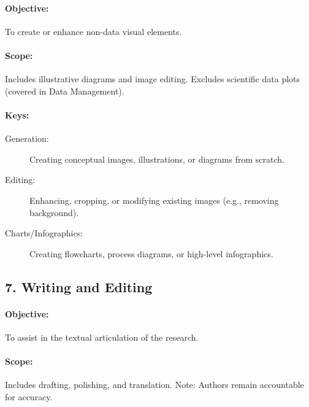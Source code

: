 \paragraph{Objective:} To create or enhance non-data visual elements.
\paragraph{Scope:} Includes illustrative diagrams and image editing.
Excludes scientific data plots (covered in Data Management).
\paragraph{Keys:}
\begin{description}
    \item[Generation:] Creating conceptual images, illustrations, or diagrams from scratch.
    \item[Editing:] Enhancing, cropping, or modifying existing images (e.g., removing background).
    \item[Charts/Infographics:] Creating flowcharts, process diagrams, or high-level infographics.
\end{description}

\subsection*{7. Writing and Editing}
\paragraph{Objective:} To assist in the textual articulation of the research.
\paragraph{Scope:} Includes drafting, polishing, and translation.
Note: Authors remain accountable for accuracy.
